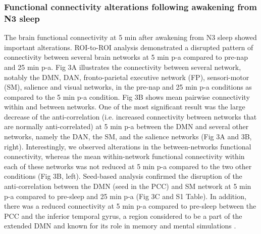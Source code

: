 \subsubsection*{Functional connectivity alterations following awakening from N3 sleep}
The brain functional connectivity at 5 min after awakening from N3 sleep showed important alterations. ROI-to-ROI analysis demonstrated a disrupted pattern of connectivity between several brain networks at 5 min p-a compared to pre-nap and 25 min p-a. Fig 3A illustrates the connectivity between several network, notably the DMN, DAN, fronto-parietal executive network (FP), sensori-motor (SM), salience and visual networks, in the pre-nap and 25 min p-a conditions as compared to the 5 min p-a condition. Fig 3B shows mean pairwise connectivity within and between networks. One of the most significant result was the large decrease of the anti-correlation (i.e. increased connectivity between networks that are normally anti-correlated) at 5 min p-a between the DMN and several other networks, namely the DAN, the SM, and the salience networks (Fig 3A and 3B, right). Interestingly, we observed alterations in the between-networks functional connectivity, whereas the mean within-network functional connectivity within each of these networks was not reduced at 5 min p-a compared to the two other conditions (Fig 3B, left). Seed-based analysis confirmed the disruption of the anti-correlation between the DMN (seed in the PCC) and SM network at 5 min p-a compared to pre-sleep and 25 min p-a (Fig 3C and S1 Table). In addition, there was a reduced connectivity at 5 min p-a compared to pre-sleep between the PCC and the inferior temporal gyrus, a region considered to be a part of the extended DMN and known for its role in memory and mental simulations \citep{christoff_mind-wandering_2016}.

